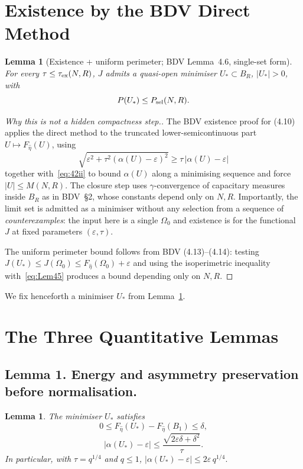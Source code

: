 \documentclass[11pt]{article}
\newtheorem{lemma}[theorem]{Lemma}
\theoremstyle{definition}
\newcommand{\eps}{\varepsilon}
\newcommand{\Om}{\Omega}
\begin{document}
\section{Existence by the BDV Direct Method}\label{sec:existence}

\begin{lemma}[Existence + uniform perimeter; BDV Lemma~4.6, single-set form]
\label{lem:ex}
For every $\tau\le\tau_{\rm ex}(N,R)$, $J$ admits a quasi-open minimiser
$U_*\subset B_R$, $|U_*|>0$, with
\[
P(U_*)\le P_{\rm sel}(N,R).
\]
\end{lemma}

\begin{proof}[Why this is not a hidden compactness step.]
The BDV existence proof for (4.10) applies the direct method to the
truncated lower-semicontinuous part $U\mapsto F_{\hat\eta}(U)$, using
\[
\sqrt{\eps^2+\tau^2(\alpha(U)-\eps)^2}\ge\tau\,|\alpha(U)-\eps|
\]
together with~\eqref{eq:42ii} to bound $\alpha(U)$ along a minimising
sequence and force $|U|\le M(N,R)$. The closure step uses
$\gamma$-convergence of capacitary measures inside $B_R$ as in BDV~\S2,
whose constants depend only on $N,R$. Importantly, the limit set is
admitted as a minimiser without any selection from a sequence of
\emph{counterexamples}: the input here is a single $\Om_0$ and existence is
for the functional $J$ at fixed parameters $(\eps,\tau)$.

The uniform perimeter bound follows from BDV (4.13)--(4.14): testing
$J(U_*)\le J(\Om_0)\le F_{\hat\eta}(\Om_0)+\eps$ and using the
isoperimetric inequality with~\eqref{eq:Lem45} produces a bound depending
only on $N,R$.
\end{proof}

We fix henceforth a minimiser $U_*$ from Lemma~\ref{lem:ex}.

\section{The Three Quantitative Lemmas}

\subsection*{Lemma 1. Energy and asymmetry preservation before normalisation.}

\begin{lemma}\label{lem:1}
The minimiser $U_*$ satisfies
\begin{equation}\label{eq:L1a}
0\le F_{\hat\eta}(U_*)-F_{\hat\eta}(B_1)\le\delta,
\end{equation}
\begin{equation}\label{eq:L1b}
|\alpha(U_*)-\eps|\le\frac{\sqrt{2\eps\delta+\delta^2}}{\tau}.
\end{equation}
In particular, with $\tau=q^{1/4}$ and $q\le1$,
$|\alpha(U_*)-\eps|\le 2\eps\,q^{1/4}.$
\end{lemma}
\end{document}
